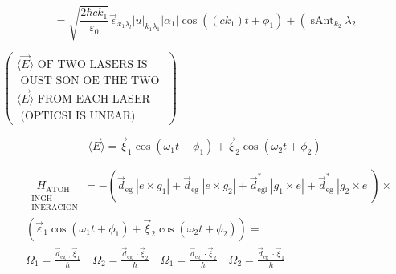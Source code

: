 \documentclass[10pt]{article}
\begin{document}
$$
=\sqrt{\frac{2 \hbar c k_{1}}{\varepsilon_{0}}} \vec{\epsilon}_{x_{1} \lambda_{l}}|u|_{k_{1} \lambda_{1}}\left|\alpha_{1}\right| \cos \left(\left(c k_{1}\right) t+\phi_{1}\right)+\left(\operatorname{sAnt}_{k_{2}} \lambda_{2}\right.
$$

$\left(\begin{array}{l}\langle\vec{E}\rangle \text { OF TWO LASERS IS } \\ \text { OUST SON OE THE TWO } \\ \langle\vec{E}\rangle \text { FROM EACH LASER } \\ \text { (OPTICSI IS UNEAR) }\end{array}\right)$

$$
\langle\vec{E}\rangle=\vec{\xi}_{1} \cos \left(\omega_{1} t+\phi_{1}\right)+\vec{\xi}_{2} \cos \left(\omega_{2} t+\phi_{2}\right)
$$

$$
\begin{aligned}
& \underset{\substack{\text { INGH } \\
\text { INERACION }}}{H_{\text {ATOH }}}=-\left(\vec{d}_{\text {eg }}\left|e \times g_{1}\right|+\vec{d}_{\text {eg }}\left|e \times g_{2}\right|+\vec{d}_{\text {egl }}^{*}\left|g_{1} \times e\right|+\vec{d}_{\text {eg }}^{*}\left|g_{2} \times e\right|\right) \times \\
&\left(\vec{\varepsilon}_{1} \cos \left(\omega_{1} t+\phi_{1}\right)+\vec{\xi}_{2} \cos \left(\omega_{2} t+\phi_{2}\right)\right)= \\
& \Omega_{1}=\frac{\vec{d}_{\text {eg }}, \vec{\xi}_{1}}{\hbar} \quad \Omega_{2}=\frac{\vec{d}_{\text {eg }} \cdot \vec{\xi}_{2}}{\hbar} \quad \Omega_{1}=\frac{\vec{d}_{\text {eg }} \cdot \vec{\xi}_{2}}{\hbar} \quad \Omega_{2}=\frac{\vec{d}_{\text {eg }} \cdot \vec{\xi}_{1}}{\hbar}
\end{aligned}
$$
\end{document}
